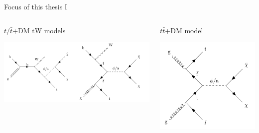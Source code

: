 \documentclass[8pt]{beamer}
\begin{document}
\begin{frame}{Focus of this thesis I}
\begin{columns}
	\begin{column}{0.675\textwidth}
		\begin{center}
			\begin{block}{ \centering $t/ \bar t$+DM tW models}\end{block}	
			\includegraphics[width=1.0\textwidth]{figs/feynman_tDM_mine.png}
    		 \end{center}
	\end{column} \hfill
	\begin{column}{0.3\textwidth}
		\begin{center}
			\begin{block}{\centering $t \bar t$+DM model}\end{block}				
			\includegraphics[width=1.0\textwidth]{figs/feynman_ttDM_mine.png}
    		 \end{center}
	\end{column} \hfill
\end{columns} \vfill


\end{frame}
\end{document}

